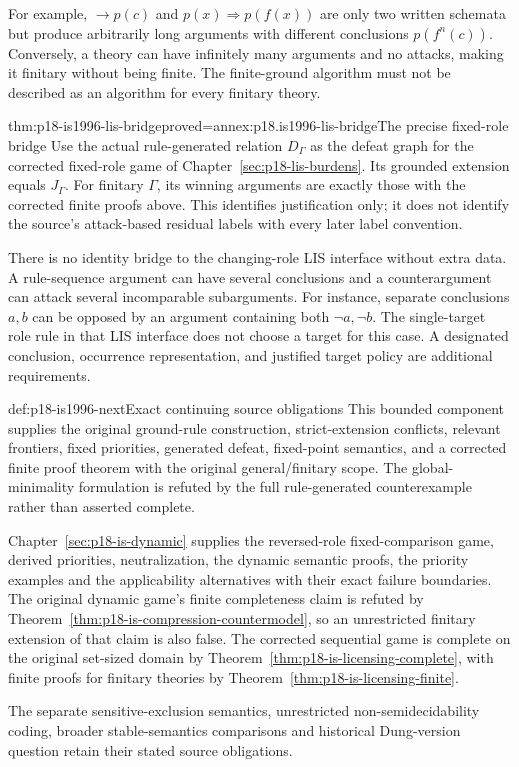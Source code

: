 For example, \(\to p(c)\) and \(p(x)\Rightarrow p(f(x))\)
are only two written schemata but produce arbitrarily long
arguments with different conclusions \(p(f^n(c))\).
Conversely, a theory can have infinitely many arguments and
no attacks, making it finitary without being finite.
The finite-ground algorithm must not be described as an
algorithm for every finitary theory.

\begin{hbtheorem}{thm:p18-is1996-lis-bridge}{proved=annex:p18.is1996-lis-bridge}{The precise fixed-role bridge}
Use the actual rule-generated relation \(D_\Gamma\) as the
defeat graph for the corrected fixed-role game of
Chapter~\ref{sec:p18-lis-burdens}.
Its grounded extension equals \(J_\Gamma\).
For finitary \(\Gamma\), its winning arguments are exactly
those with the corrected finite proofs above.
This identifies justification only; it does not identify the
source's attack-based residual labels with every later label convention.
\end{hbtheorem}

There is no identity bridge to the changing-role LIS interface
without extra data. A rule-sequence argument can have several
conclusions and a counterargument can attack several incomparable
subarguments. For instance, separate conclusions \(a,b\)
can be opposed by an argument containing both \(\neg a,\neg b\).
The single-target role rule in that LIS interface does not
choose a target for this case. A designated conclusion, occurrence
representation, and justified target policy are additional requirements.

\begin{proofboundary}{def:p18-is1996-next}{Exact continuing source obligations}
This bounded component supplies the original ground-rule construction,
strict-extension conflicts, relevant frontiers, fixed priorities,
generated defeat, fixed-point semantics, and a corrected finite
proof theorem with the original general/finitary scope.
The global-minimality formulation is refuted by the full
rule-generated counterexample rather than asserted complete.

Chapter~\ref{sec:p18-is-dynamic} supplies the reversed-role
fixed-comparison game, derived priorities, neutralization,
the dynamic semantic proofs, the priority examples and the
applicability alternatives with their exact failure boundaries.
The original dynamic game's finite completeness claim is
refuted by Theorem~\ref{thm:p18-is-compression-countermodel},
so an unrestricted finitary extension of that claim is also false.
The corrected sequential game is complete on the original
set-sized domain by Theorem~\ref{thm:p18-is-licensing-complete},
with finite proofs for finitary theories by
Theorem~\ref{thm:p18-is-licensing-finite}.

The separate sensitive-exclusion semantics, unrestricted
non-semidecidability coding, broader stable-semantics comparisons
and historical Dung-version question retain their stated
source obligations.
\end{proofboundary}
